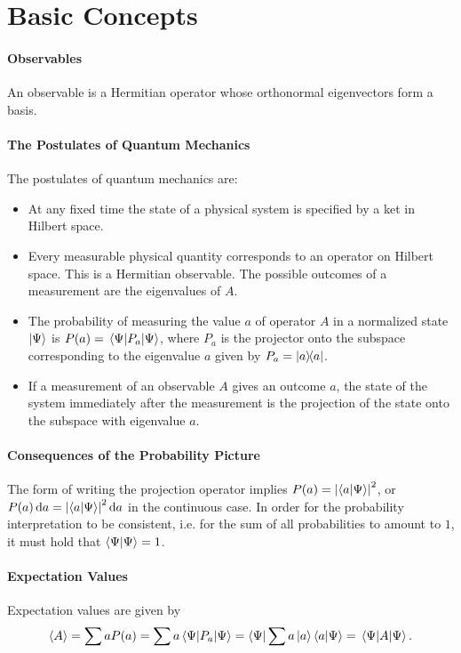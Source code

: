 \section{Basic Concepts}

\paragraph{Observables}
An observable is a Hermitian operator whose orthonormal eigenvectors form a basis.

\paragraph{The Postulates of Quantum Mechanics}
The postulates of quantum mechanics are:
\begin{itemize}
	\item At any fixed time the state of a physical system is specified by a ket in Hilbert space.
	\item Every measurable physical quantity corresponds to an operator on Hilbert space. This is a Hermitian observable. The possible outcomes of a measurement are the eigenvalues of $A$.
	\item The probability of measuring the value $a$ of operator $A$ in a normalized state $\ket{\Psi}$ is $P(a) = \expval{P_{a}}{\Psi}$, where $P_{a}$ is the projector onto the subspace corresponding to the eigenvalue $a$ given by $P_{a} = \dyad{a}{a}$.
	\item If a measurement of an observable $A$ gives an outcome $a$, the state of the system immediately after the measurement is the projection of the state onto the subspace with eigenvalue $a$.
\end{itemize}

\paragraph{Consequences of the Probability Picture}
The form of writing the projection operator implies $P(a) = \abs{\bra{a}\ket{\Psi}}^{2}$, or $P(a)\dd{a} = \abs{\bra{a}\ket{\Psi}}^{2}\dd{a}$ in the continuous case. In order for the probability interpretation to be consistent, i.e. for the sum of all probabilities to amount to $1$, it must hold that $\bra{\Psi}\ket{\Psi} = 1$.

\paragraph{Expectation Values}
Expectation values are given by
\begin{align*}
	\expval{A} = \sum aP(a) = \sum a\expval{P_{a}}{\Psi} = \bra{\Psi}\sum a\ket{a}\bra{a}\ket{\Psi} = \expval{A}{\Psi}.
\end{align*}


